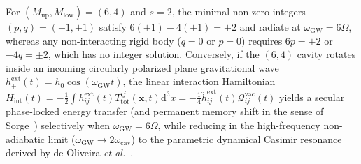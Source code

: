 \documentclass[aps,prd,twocolumn,10pt,showkeys,nofootinbib,floatfix,longbibliography]{revtex4-2}
\newcommand{\dd}{\mathrm{d}}
\begin{document}
For $(M_{\mathrm{up}}, M_{\mathrm{low}}) = (6, 4)$ and $s = 2$, the minimal non-zero integers $(p, q) = (\pm 1, \pm 1)$ satisfy $6(\pm 1) - 4(\pm 1) = \pm 2$ and radiate at $\omega_{\mathrm{GW}} = 6\Omega$, whereas any non-interacting rigid body ($q = 0$ or $p = 0$) requires $6p = \pm 2$ or $-4q = \pm 2$, which has no integer solution. Conversely, if the $(6,4)$ cavity rotates inside an incoming circularly polarized plane gravitational wave $h_+^{\mathrm{ext}}(t) = h_0\cos(\omega_{\mathrm{GW}} t)$, the linear interaction Hamiltonian $H_{\mathrm{int}}(t) = -\frac{1}{2}\int h_{ij}^{\mathrm{ext}}(t) T^{ij}_{\mathrm{tot}}(\mathbf{x}, t)\dd^3x = -\frac{1}{4}\ddot{h}_{ij}^{\mathrm{ext}}(t)\mathcal{Q}_{ij}^{\mathrm{vac}}(t)$ yields a secular phase-locked energy transfer (and permanent memory shift in the sense of Sorge~\cite{sorge2023memory}) selectively when $\omega_{\mathrm{GW}} = 6\Omega$, while reducing in the high-frequency non-adiabatic limit ($\omega_{\mathrm{GW}} \to 2\omega_{\mathrm{cav}}$) to the parametric dynamical Casimir resonance derived by de Oliveira \emph{et al.}~\cite{deoliveira2026entropy}.


\end{document}
